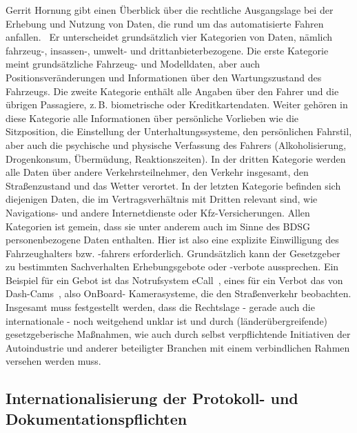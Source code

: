 \documentclass[twoside,a4paper,12pt]{article}
\begin{document}
Gerrit Hornung gibt einen Überblick über die rechtliche Ausgangslage bei der Erhebung und Nutzung von Daten, die rund um das automatisierte Fahren
anfallen.~\cite{ho} Er unterscheidet grundsätzlich vier Kategorien von Daten, nämlich fahr\-zeug-, insassen-, umwelt- und 
drittanbieterbezogene. Die erste Kategorie meint grundsätzliche Fahrzeug- und Modelldaten, aber auch Positionsveränderungen und Informationen über den
Wartungszustand des Fahrzeugs. Die zweite Kategorie enthält alle Angaben über den Fahrer und die übrigen Passagiere, z.\,B. biometrische oder Kreditkartendaten.
Weiter gehören in diese Kategorie alle Informationen über persönliche Vorlieben wie die Sitzposition, die Einstellung der Unterhaltungssysteme, den
persönlichen Fahrstil, aber auch die psychische und physische Verfassung des Fahrers (Alkoholisierung, Drogenkonsum, Übermüdung, Reaktionszeiten).
In der dritten Kategorie werden alle Daten über andere Verkehrsteilnehmer, den Verkehr insgesamt, den Straßenzustand und das Wetter verortet.
In der letzten Kategorie befinden sich diejenigen Daten, die im Vertragsverhältnis mit Dritten relevant sind, wie Navigations- und andere Internetdienste oder
Kfz-Versicherungen.
Allen Kategorien ist gemein, dass sie unter anderem auch im Sinne des BDSG personenbezogene Daten enthalten. Hier ist also eine explizite Einwilligung
des Fahrzeughalters bzw. -fahrers erforderlich. Grundsätzlich kann der Gesetzgeber zu bestimmten Sachverhalten Erhebungsgebote oder -verbote aussprechen.
Ein Beispiel für ein Gebot ist das Notrufsystem eCall\mbox{~\cite[S. 362]{ho}}, eines für ein Verbot das von Dash-Cams\mbox{~\cite[S. 363]{ho}}, also OnBoard-
Kamerasysteme, die den Straßenverkehr beobachten. Insgesamt muss festgestellt werden, dass die Rechtslage - gerade auch die internationale - noch weitgehend 
unklar ist und durch (länderübergreifende) gesetzgeberische Maßnahmen, wie auch durch selbst verpflichtende Initiativen der Autoindustrie und anderer beteiligter 
Branchen mit einem verbindlichen Rahmen versehen werden muss.\\

\subsection{Internationalisierung der Protokoll- und Dokumentationspflichten} \label{InternationaleStandardisierungDerProtokollUndDokumentationspflichten}
\end{document}
